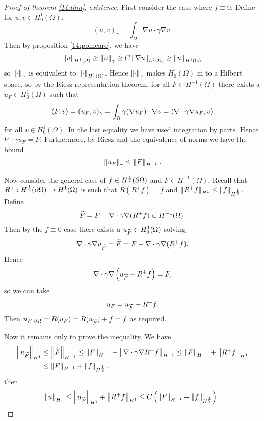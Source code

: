 \begin{proof}[Proof of theorem \ref{14:thm}, existence]
  First consider the case where $f\equiv0$.
  Define for $u,v \in H_0^1(\Omega)$:
  \[ (u,v)_\gamma = \int_\Omega \nabla u \cdot\gamma \nabla v. \]
  Then by proposition \ref{14:poincare}, we have
  \[ \left\lVert u \right\rVert_{H^1(\Omega)} \geq \left\lVert u \right\rVert_\gamma \geq C\left\lVert \nabla u \right\rVert_{L^2(\Omega)} \geq \left\lVert u \right\rVert_{H^1(\Omega)} \]
  so $\left\lVert \cdot \right\rVert_\gamma$ is equivalent to $\left\lVert \cdot \right\rVert_{H^1(\Omega)}$.
  Hence $\left\lVert \cdot \right\rVert_\gamma$ makes $H_0^1(\Omega)$ in to a Hilbert space, so by the Riesz representation theorem, for all $F\in H^{-1}(\Omega)$ there exists a $u_F\in H_0^1(\Omega)$ such that
  \[ {\left\langle F,v \right\rangle} = (u_F,v)_\gamma = \int_\Omega \gamma(\nabla u_F) \cdot \nabla v = {\left\langle \nabla\cdot \gamma\nabla u_F,v \right\rangle} \]
  for all $v \in H_0^1(\Omega)$.
  In the last equality we have used integration by parts.
  Hence $\nabla\cdot\gamma u_F=F$.
  Furthermore, by Riesz and the equivalence of norms we have the bound
  \[ \left\lVert u_F \right\rVert_\gamma \leq \left\lVert F \right\rVert_{H^{-1}}. \]

  Now consider the general case of $f\in H^\frac12(\partial\Omega)$ and $F\in H^{-1}(\Omega)$.
  Recall that $R^+: H^\frac12(\partial\Omega) \to H^1(\Omega)$ is such that $R(R^+f)=f$ and $\left\lVert R^+f \right\rVert_{H^1} \leq \left\lVert f \right\rVert_{H^\frac12}$.
  Define
  \[ \widetilde F = F - \nabla\cdot\gamma\nabla(R^+f) \in H^{-1}(\Omega). \]
  Then by the $f\equiv0$ case there exists a $u_{\widetilde F} \in H_0^1(\Omega)$ solving
  \[ \nabla\cdot\gamma\nabla u_{\widetilde F} = \widetilde F = F-\nabla\cdot\gamma\nabla(R^+f). \]
  Hence
  \[ \nabla\cdot\gamma\nabla\left( u_{\widetilde F}+R^+f \right) = F, \]
  so we can take
  \[ u_F = u_{\widetilde F}+R^+f. \]
  Then $u_F|_{\partial\Omega} = R(u_F) = R(u_{\widetilde F}) + f = f$ as required.

  Now it remains only to prove the inequality.
  We have
  \begin{align*}
    \left\lVert u_{\widetilde F} \right\rVert_{H^1} &\leq \left\lVert \widetilde F \right\rVert_{H^{-1}} \leq \left\lVert F \right\rVert_{H^{-1}} + \left\lVert \nabla\cdot\gamma\nabla R^+f \right\rVert_{H^{-1}} \leq \left\lVert F \right\rVert_{H^{-1}} + \left\lVert R^+f \right\rVert_{H^1} \\
    &\leq \left\lVert F \right\rVert_{H^{-1}} + \left\lVert f \right\rVert_{H^\frac12},
  \end{align*}
  then
  \[ \left\lVert u \right\rVert_{H^1} \leq \left\lVert u_{\widetilde F} \right\rVert_{H^1} + \left\lVert R^+f \right\rVert_{H^1} \leq C\left( \left\lVert F \right\rVert_{H^{-1}} + \left\lVert f \right\rVert_{H^\frac12} \right). \qedhere \]
\end{proof}

